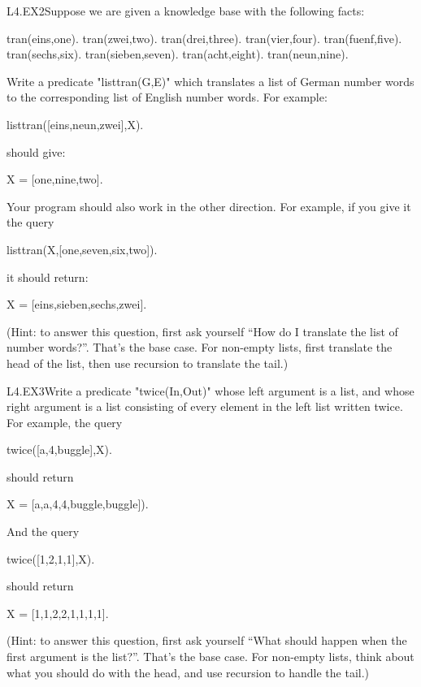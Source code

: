 \begin{LPNexercise}{L4.EX2}Suppose we are given a knowledge base with the following facts:

\begin{LPNcodedisplay}
tran(eins,one).
tran(zwei,two).
tran(drei,three).
tran(vier,four).
tran(fuenf,five).
tran(sechs,six).
tran(sieben,seven).
tran(acht,eight).
tran(neun,nine).
\end{LPNcodedisplay}



Write a predicate "listtran(G,E)" which translates a list of
German number words to the corresponding list of English number words.
For example:
\begin{LPNcodedisplay}
listtran([eins,neun,zwei],X).
\end{LPNcodedisplay}
should give:
\begin{LPNcodedisplay}
X = [one,nine,two].
\end{LPNcodedisplay}

Your program should also work in the other direction. For example, if
you give it the query
\begin{LPNcodedisplay}
listtran(X,[one,seven,six,two]).
\end{LPNcodedisplay}
it should return:
\begin{LPNcodedisplay}
X = [eins,sieben,sechs,zwei].
\end{LPNcodedisplay}


(Hint: to answer this question, first ask yourself ``How do I
translate the  list of number words?''.  That's the base
case.  For non-empty lists, first translate the head of the list, then
use recursion to translate the tail.)
\end{LPNexercise}


\begin{LPNexercise}{L4.EX3}Write a predicate "twice(In,Out)"
whose left argument is a list,
and whose right argument is a list consisting of every element in the
left list written twice.  For example, the query
\begin{LPNcodedisplay}
twice([a,4,buggle],X).
\end{LPNcodedisplay}
should return
\begin{LPNcodedisplay}
X = [a,a,4,4,buggle,buggle]).
\end{LPNcodedisplay}
And the query
\begin{LPNcodedisplay}
twice([1,2,1,1],X).
\end{LPNcodedisplay}
should return
\begin{LPNcodedisplay}
X = [1,1,2,2,1,1,1,1].
\end{LPNcodedisplay}

(Hint: to answer this question, first ask yourself ``What should happen
when the first argument is the  list?''.  That's the base case.
For non-empty lists, think about what you should do with the head, and
use recursion to handle the tail.)
\end{LPNexercise}


